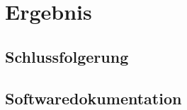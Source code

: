 \begin{comment}
Ergebnisse der Arbeit: was wurde erreicht, was wurde nicht erreicht, Ursachen.
Dieser Abschnitt richtet sich an den speziell für das entsprechende Fachgebiet
interessierten Ingenieur. Er soll es ihm ermöglichen, die für die Problemlösung
gemachten Überlegungen zu verstehen und nachzuvollziehen. Theoretische
Grundlagen sind nur so weit auszuarbeiten, als dies für die Lösung der Aufgabe
nötig ist (keine Lehrbücher schreiben). Die Erkenntnisse aus den theoretischen
Untersuchungen sind wenn immer möglich direkt mit der Problemlösung zu
verknüpfen.

Schlussfolgerungen, Bewertung der Ergebnisse.
Die Schlussfolgerungen bilden zusammen mit der Zusammenfassung die
wichtigsten Abschnitte eines Berichts und sollen daher am sorgfältigsten
ausgearbeitet sein. Die Schlussfolgerungen enthalten eine Zusammenfassung
und Beurteilung der Resultate (Vergleich mit anderen Lösungen, was wurde
erreicht, was nicht, was bleibt noch zu tun, was würde man nun anders tun). In
den Schlussfolgerungen soll auch ein Ausblick auf das weitere Vorgehen bzw.
auf die Bedeutung der erreichten Ergebnisse gegeben werden.

Installationsanleitung vorhanden (inklusive verwendete Entwicklungsumgebung und Werkzeuge), Test-Logs dokumentiert (bei Systemen mit User Interfaces: Dokumentation der Usability Tests)
\end{comment}

\chapter{Ergebnis}
\xxx

\section{Schlussfolgerung}
\xxx

\section{Softwaredokumentation}
\xxx

